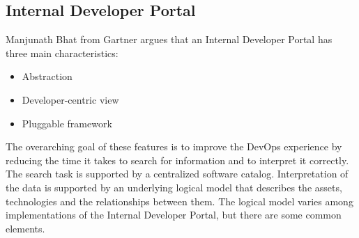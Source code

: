 \documentclass[a4paper,10pt]{article}
\begin{document}
    \subsection{Internal Developer Portal}
    \label{subsec:vpportal}
    Manjunath Bhat from Gartner argues that an Internal Developer Portal has three main characteristics\parencite{gartner}:
    \begin{itemize}
        \item Abstraction
        \item Developer-centric view
        \item Pluggable framework
    \end{itemize}
    The overarching goal of these features is to improve the DevOps experience by reducing the time it takes to search
    for information and to interpret it correctly.
    The search task is supported by a centralized software catalog.
    Interpretation of the data is supported by an underlying logical model that describes the assets, technologies
    and the relationships between them.
    The logical model varies among implementations of the Internal Developer Portal, but there are some common elements.
\end{document}
